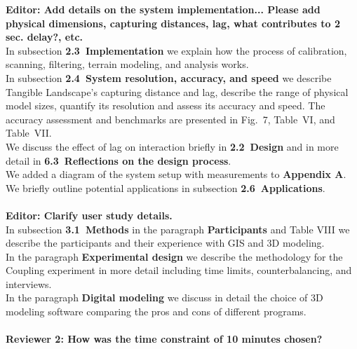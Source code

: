 \documentclass[prodmode,acmtochi]{acmsmall} %
\begin{document}
\textbf{Editor: Add details on the system implementation... Please add physical dimensions, capturing distances, lag, what contributes to 2 sec. delay?, etc.} \\

In subsection \textbf{2.3~Implementation} 
we explain how the process of calibration, scanning, filtering,
terrain modeling, and analysis works.\\

In subsection \textbf{2.4~System resolution, accuracy, and speed} 
we describe Tangible Landscape's capturing distance and lag,
describe the range of physical model sizes,
quantify its resolution and
assess its accuracy and speed.
The accuracy assessment and benchmarks are presented 
in Fig.~7, Table~VI, and Table~VII. \\

We discuss the effect of lag on interaction 
briefly in \textbf{2.2~Design} and in more detail in
\textbf{6.3~Reflections on the design process}.\\

We added a diagram of the system setup with measurements to 
\textbf{Appendix A}. \\

We briefly outline potential applications in 
subsection  \textbf{2.6~Applications}. \\

\hrulefill \\

\textbf{Editor: Clarify user study details.} \\

In subsection \textbf{3.1~Methods}
in the paragraph \textbf{Participants} and Table VIII
we describe the participants 
and their experience with GIS and 3D modeling. \\

In the paragraph \textbf{Experimental design}
we describe the methodology for the Coupling experiment
in more detail including time limits, counterbalancing, and interviews. \\

In the paragraph \textbf{Digital modeling}
we discuss in detail the choice of 3D modeling software
comparing the pros and cons of different programs. \\

\hrulefill \\

\textbf{Reviewer 2: How was the time constraint of 10 minutes chosen?}\\
\end{document}
